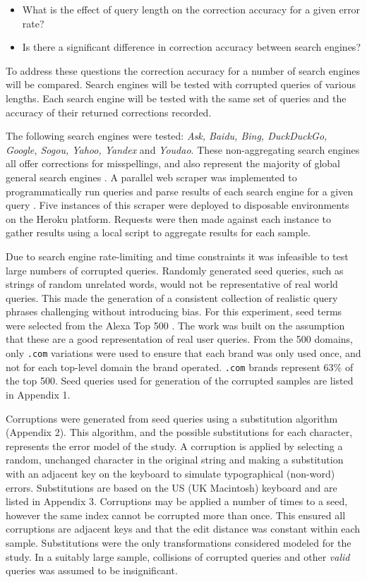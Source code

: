 \documentclass{csfourzero}
\begin{document}
\begin{itemize}
  \item{What is the effect of query length on the correction accuracy for a given error rate?}
  \item{Is there a significant difference in correction accuracy between search engines?}
\end{itemize}

\noindent
To address these questions the correction accuracy for a number of search engines will be compared. Search engines will be tested with corrupted queries of various lengths. Each search engine will be tested with the same set of queries and the accuracy of their returned corrections recorded.

The following search engines were tested: \textit{Ask, Baidu, Bing, DuckDuckGo, Google, Sogou, Yahoo, Yandex} and \textit{Youdao}. These non-aggregating search engines all offer corrections for misspellings, and also represent the majority of global general search engines \cite{searchenginewiki}. A parallel web scraper was implemented to programmatically run queries and parse results of each search engine for a given query \cite{scraper}. Five instances of this scraper were deployed to disposable environments on the Heroku platform. Requests were then made against each instance to gather results using a local script to aggregate results for each sample.

Due to search engine rate-limiting and time constraints it was infeasible to test large numbers of corrupted queries. Randomly generated seed queries, such as strings of random unrelated words, would not be representative of real world queries. This made the generation of a consistent collection of realistic query phrases challenging without introducing bias. For this experiment, seed terms were selected from the Alexa Top 500 \cite{alexatop500}. The work was built on the assumption that these are a good representation of real user queries. From the 500 domains, only \texttt{.com} variations were used to ensure that each brand was only used once, and not for each top-level domain the brand operated. \texttt{.com} brands represent 63\% of the top 500. Seed queries used for generation of the corrupted samples are listed in Appendix 1.

Corruptions were generated from seed queries using a substitution algorithm (Appendix 2). This algorithm, and the possible substitutions for each character, represents the error model of the study. A corruption is applied by selecting a random, unchanged character in the original string and making a substitution with an adjacent key on the keyboard to simulate typographical (non-word) errors. Substitutions are based on the US (UK Macintosh) keyboard and are listed in Appendix 3. Corruptions may be applied a number of times to a seed, however the same index cannot be corrupted more than once. This ensured all corruptions are adjacent keys and that the edit distance was constant within each sample. Substitutions were the only transformations considered modeled for the study. In a suitably large sample, collisions of corrupted queries and other \textit{valid} queries was assumed to be insignificant.
\end{document}

